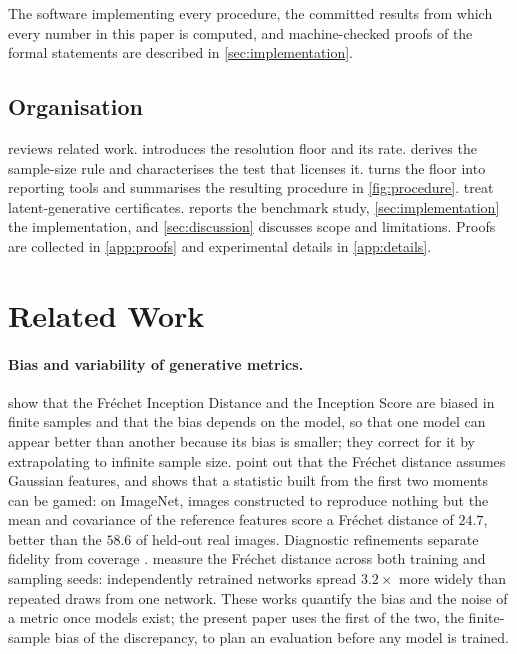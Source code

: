 \documentclass[twoside,11pt]{article}
\theoremstyle{plain}
\theoremstyle{definition}
\theoremstyle{remark}
\begin{document}
The software implementing every procedure, the committed results from which
every number in this paper is computed, and machine-checked proofs of the
formal statements are described in \cref{sec:implementation}.

\subsection{Organisation}\label{sec:intro-organisation}

 reviews related work.  introduces
the resolution floor and its rate.  derives the
sample-size rule and characterises the test that licenses it.
 turns the floor into reporting tools and summarises
the resulting procedure in \cref{fig:procedure}.
 treat latent-generative certificates.
 reports the benchmark study, \cref{sec:implementation}
the implementation, and \cref{sec:discussion} discusses scope and
limitations. Proofs are collected in \cref{app:proofs} and experimental
details in \cref{app:details}.

\section{Related Work}\label{sec:background}

\paragraph{Bias and variability of generative metrics.}
\citet{chong2020} show that the Fr\'echet Inception Distance and the
Inception Score \citep{salimans2016} are biased in finite samples and that the bias depends on
the model, so that one model can appear better than another because its
bias is smaller; they correct for it by extrapolating to infinite sample
size. \citet{jayasumana2024} point out that the Fr\'echet distance assumes Gaussian features, and \citet{chen2026} shows that a statistic built from the first two moments
can be gamed: on ImageNet, images constructed to reproduce nothing but the
mean and covariance of the reference features score a Fr\'echet distance
of $24.7$, better than the $58.6$ of held-out real images. Diagnostic
refinements separate fidelity from coverage
\citep{sajjadi2018,kynkanniemi2019}. \citet{dufour2026} measure the Fr\'echet distance across both training
and sampling seeds: independently retrained networks spread $3.2\times$
more widely than repeated draws from one network. These works quantify the
bias and the noise of a metric once models exist; the present paper uses
the first of the two, the finite-sample bias of the discrepancy, to plan an
evaluation before any model is trained.
\end{document}
